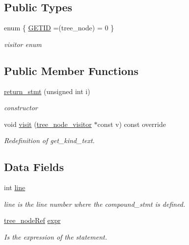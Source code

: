 \subsection*{Public Types}
\begin{DoxyCompactItemize}
\item 
enum \{ \hyperlink{structreturn__stmt_ad47dc9233209e6849b40ffe4dc73405bab036a658eba4cc422564c6f978c74af7}{G\+E\+T\+ID} =(tree\+\_\+node) = 0
 \}\begin{DoxyCompactList}\small\item\em visitor enum \end{DoxyCompactList}
\end{DoxyCompactItemize}
\subsection*{Public Member Functions}
\begin{DoxyCompactItemize}
\item 
\hyperlink{structreturn__stmt_a7ef2412ec713ad049d8260b4e97d1732}{return\+\_\+stmt} (unsigned int i)
\begin{DoxyCompactList}\small\item\em constructor \end{DoxyCompactList}\item 
void \hyperlink{structreturn__stmt_aef0ab55c5af1b107e05eddd7f4b4a88e}{visit} (\hyperlink{classtree__node__visitor}{tree\+\_\+node\+\_\+visitor} $\ast$const v) const override
\begin{DoxyCompactList}\small\item\em Redefinition of get\+\_\+kind\+\_\+text. \end{DoxyCompactList}\end{DoxyCompactItemize}
\subsection*{Data Fields}
\begin{DoxyCompactItemize}
\item 
int \hyperlink{structreturn__stmt_ad73a529fc824bd257b53c8c35c4060d9}{line}
\begin{DoxyCompactList}\small\item\em line is the line number where the compound\+\_\+stmt is defined. \end{DoxyCompactList}\item 
\hyperlink{tree__node_8hpp_a6ee377554d1c4871ad66a337eaa67fd5}{tree\+\_\+node\+Ref} \hyperlink{structreturn__stmt_a15ee3e28692fc6a52f6db84d3e0794a6}{expr}
\begin{DoxyCompactList}\small\item\em Is the expression of the statement. \end{DoxyCompactList}\end{DoxyCompactItemize}
